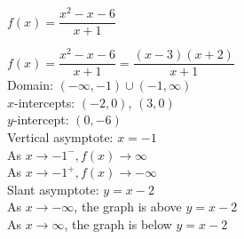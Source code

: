 {$f(x) = \dfrac{x^2-x-6}{x+1}$}
{$f(x) = \dfrac{x^2-x-6}{x+1} = \dfrac{(x-3)(x+2)}{x+1}$\\
Domain: $(-\infty, -1) \cup (-1, \infty)$\\
$x$-intercepts:  $(-2,0)$, $(3,0)$\\
$y$-intercept:  $(0,-6)$\\
Vertical asymptote: $x = -1$\\
As $x \rightarrow -1^{-}, f(x) \rightarrow \infty$\\
As $x \rightarrow -1^{+}, f(x) \rightarrow -\infty$\\
Slant asymptote: $y = x-2$ \\
As $x \rightarrow -\infty$, the graph is above $y=x-2$\\
As $x \rightarrow \infty$, the graph is below $y=x-2$


\begin{center}
\end{center}}
